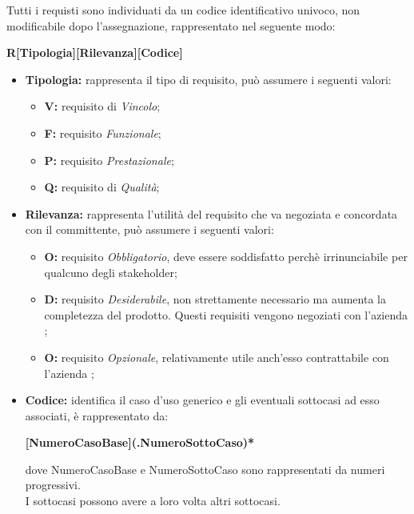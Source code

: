 Tutti i requisti sono individuati da un codice identificativo univoco, non modificabile dopo l'assegnazione, rappresentato nel seguente modo:

\begin{center}
	\textbf{R[Tipologia][Rilevanza][Codice]}
\end{center}

\begin{itemize}
	\item \textbf{Tipologia:} rappresenta il tipo di requisito, può assumere i seguenti valori:
	\begin{itemize}
		\item \textbf{V:} requisito di \textit{Vincolo};
		\item \textbf{F:} requisito \textit{Funzionale};
		\item \textbf{P:} requisito \textit{Prestazionale};
		\item \textbf{Q:} requisito di \textit{Qualità};
	\end{itemize}

	\item \textbf{Rilevanza:} rappresenta l'utilità del requisito che va negoziata e concordata con il committente, può assumere i seguenti valori:
	\begin{itemize}
		\item \textbf{O:} requisito \textit{Obbligatorio}, deve essere soddisfatto perchè irrinunciabile per qualcuno degli stakeholder;
		\item \textbf{D:} requisito \textit{Desiderabile}, non strettamente necessario ma aumenta la completezza del prodotto. Questi requisiti vengono negoziati con l'azienda \Proponente;
		\item \textbf{O:} requisito \textit{Opzionale}, relativamente utile anch'esso contrattabile con l'azienda \Proponente;
	\end{itemize}

	\item \textbf{Codice:} identifica il caso d'uso generico e gli eventuali sottocasi ad esso associati, è rappresentato da:
	\begin{center}
		\textbf{[NumeroCasoBase](.NumeroSottoCaso)*}
	\end{center}
	dove NumeroCasoBase e NumeroSottoCaso sono rappresentati da numeri progressivi. \\
	I sottocasi possono avere a loro volta altri sottocasi.	
\end{itemize}

